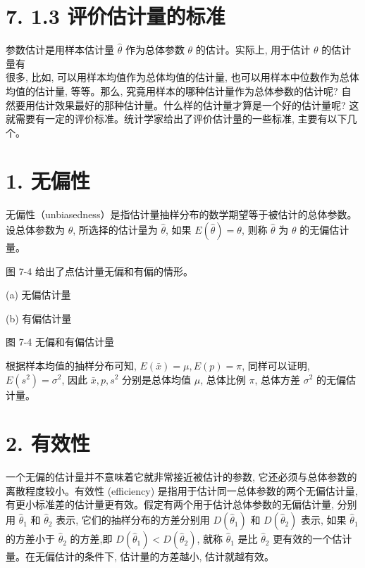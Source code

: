 \documentclass[10pt]{article}
\begin{document}
\begin{CJK*}{UTF8}{bsmi}
\section*{7. 1.3 评价估计量的标准}
参数估计是用样本估计量 $\hat{\theta}$ 作为总体参数 $\theta$ 的估计。实际上, 用于估计 $\theta$ 的估计量有\\
很多, 比如, 可以用样本均值作为总体均值的估计量, 也可以用样本中位数作为总体均值的估计量, 等等。那么, 究竟用样本的哪种估计量作为总体参数的估计呢? 自然要用估计效果最好的那种估计量。什么样的估计量才算是一个好的估计量呢? 这就需要有一定的评价标准。统计学家给出了评价估计量的一些标准, 主要有以下几个。

\section*{1. 无偏性}
无偏性（unbiasedness）是指估计量抽样分布的数学期望等于被估计的总体参数。设总体参数为 $\theta$, 所选择的估计量为 $\hat{\theta}$, 如果 $E(\hat{\theta})=\theta$, 则称 $\hat{\theta}$ 为 $\theta$ 的无偏估计量。

图 7-4 给出了点估计量无偏和有偏的情形。

\begin{center}
\end{center}

(a) 无偏估计量

\begin{center}
\end{center}

(b) 有偏估计量

图 7-4 无偏和有偏估计量

根据样本均值的抽样分布可知, $E(\bar{x})=\mu, E(p)=\pi$, 同样可以证明, $E\left(s^{2}\right)=\sigma^{2}$, 因此 $\bar{x}, p, s^{2}$ 分别是总体均值 $\mu$, 总体比例 $\pi$, 总体方差 $\sigma^{2}$ 的无偏估计量。

\section*{2. 有效性}
一个无偏的估计量并不意味着它就非常接近被估计的参数, 它还必须与总体参数的离散程度较小。有效性 (efficiency) 是指用于估计同一总体参数的两个无偏估计量, 有更小标准差的估计量更有效。假定有两个用于估计总体参数的无偏估计量, 分别用 $\hat{\theta}_{1}$ 和 $\hat{\theta}_{2}$ 表示, 它们的抽样分布的方差分别用 $D\left(\hat{\theta}_{1}\right)$ 和 $D\left(\hat{\theta}_{2}\right)$ 表示, 如果 $\hat{\theta}_{1}$ 的方差小于 $\hat{\theta}_{2}$ 的方差,即 $D\left(\hat{\theta}_{1}\right)<D\left(\hat{\theta}_{2}\right)$, 就称 $\hat{\theta}_{1}$ 是比 $\hat{\theta}_{2}$ 更有效的一个估计量。在无偏估计的条件下, 估计量的方差越小, 估计就越有效。


\end{CJK*}
\end{document}
